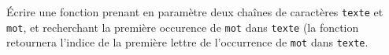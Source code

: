 Écrire une fonction prenant en paramètre deux chaînes de caractères \texttt{texte} et \texttt{mot}, 
et recherchant la première occurence de \texttt{mot} dans \texttt{texte} (la fonction retournera 
l'indice de la première lettre de l'occurrence de \texttt{mot} dans \texttt{texte}.
